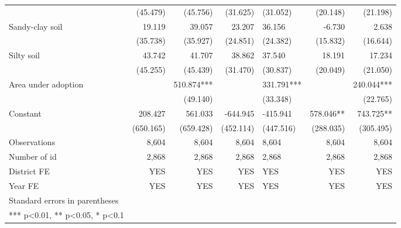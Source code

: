 \documentclass[
]{article}
\begin{document}
\begin{landscape}
\begin{longtable}[t]{lrrrlrr}
 & (45.479) & (45.756) & (31.625) & (31.052) & (20.148) & (21.198)\\
Sandy-clay soil & 19.119 & 39.057 & 23.207 & 36.156 & -6.730 & 2.638\\
 & (35.738) & (35.927) & (24.851) & (24.382) & (15.832) & (16.644)\\
Silty soil & 43.742 & 41.707 & 38.862 & 37.540 & 18.191 & 17.234\\
 & (45.255) & (45.439) & (31.470) & (30.837) & (20.049) & (21.050)\\
Area under adoption &  & 510.874*** &  & 331.791*** &  & 240.044***\\
 &  & (49.140) &  & (33.348) &  & (22.765)\\
Constant & 208.427 & 561.033 & -644.945 & -415.941 & 578.046** & 743.725**\\
 & (650.165) & (659.428) & (452.114) & (447.516) & (288.035) & (305.495)\\
Observations & 8,604 & 8,604 & 8,604 & 8,604 & 8,604 & 8,604\\
Number of id & 2,868 & 2,868 & 2,868 & 2,868 & 2,868 & 2,868\\
District FE & YES & YES & YES & YES & YES & YES\\
Year FE & YES & YES & YES & YES & YES & YES\\
Standard errors in parentheses &  &  &  &  &  & \\
*** p<0.01, ** p<0.05, * p<0.1 &  &  &  &  &  & \\*
\end{longtable}
\endgroup{}
\end{landscape}

\newpage
\end{document}
